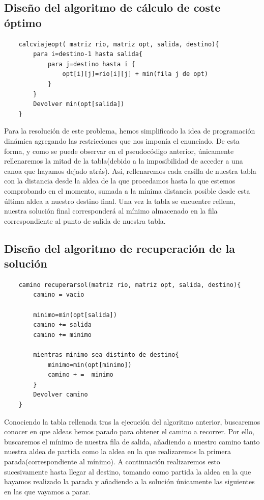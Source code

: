 \subsection{Diseño del algoritmo de cálculo de coste óptimo}
\begin{lstlisting}
    calcviajeopt( matriz rio, matriz opt, salida, destino){
        para i=destino-1 hasta salida{
            para j=destino hasta i {
                opt[i][j]=rio[i][j] + min(fila j de opt)
            }
        }
        Devolver min(opt[salida])
    }
\end{lstlisting}
Para la resolución de este problema, hemos simplificado la idea de programación dinámica agregando las restricciones que nos imponía el enunciado. De esta forma, y como se puede observar en el pseudocódigo anterior, únicamente rellenaremos la mitad de la tabla(debido a la imposibilidad de acceder a una canoa que hayamos dejado atrás). Así, rellenaremos cada casilla de nuestra tabla con la distancia desde la aldea de la que procedamos hasta la que estemos comprobando en el momento, sumada a la mínima distancia posible desde esta última aldea a nuestro destino final.
Una vez la tabla se encuentre rellena, nuestra solución final corresponderá al mínimo almacenado en la fila correspondiente al punto de salida de nuestra tabla.


\subsection{Diseño del algoritmo de recuperación de la solución}
\begin{lstlisting}
    camino recuperarsol(matriz rio, matriz opt, salida, destino){
        camino = vacio
        
        minimo=min(opt[salida])
        camino += salida
        camino += minimo
        
        mientras minimo sea distinto de destino{
            minimo=min(opt[minimo])
            camino + =  minimo
        }
        Devolver camino
    }
\end{lstlisting}
Conociendo la tabla rellenada tras la ejecución del algoritmo anterior, buscaremos conocer en que aldeas hemos parado para obtener el camino a recorrer. Por ello, buscaremos el mínimo de nuestra fila de salida, añadiendo a nuestro camino tanto nuestra aldea de partida como la aldea en la que realizaremos la primera parada(correspondiente al mínimo).
A continuación realizaremos esto sucesivamente hasta llegar al destino, tomando como partida la aldea en la que hayamos realizado la parada y añadiendo a la solución únicamente las siguientes en las que vayamos a parar.
